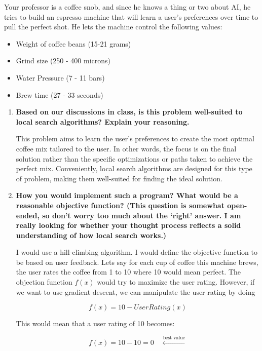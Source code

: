 \documentclass[a4paper]{article}
\begin{document}
\begin{sloppypar}
Your professor is a coffee snob, and since he knows a thing or two about AI, he tries to
build an espresso machine that will learn a user’s preferences over time to pull the perfect
shot. He lets the machine control the following values:

\begin{itemize}
    \item Weight of coffee beans (15-21 grams)
    \item Grind size (250 - 400 microns)
    \item Water Pressure (7 - 11 bars)
    \item Brew time (27 - 33 seconds)
\end{itemize}

\begin{enumerate}[start=9,label=Q\arabic*,left=0pt]
    \item \textbf{Based on our discussions in class, is this problem well-suited to local search algorithms? Explain your reasoning.}
    \par This problem aims to learn the user’s preferences to create the most optimal coffee mix tailored to the user. 
    In other words, the focus is on the final solution rather than the specific optimizations or paths taken to achieve the perfect mix. 
    Conveniently, local search algorithms are designed for this type of problem, making them well-suited for finding the ideal solution.
    
    \item \textbf{How you would implement such a program? What would be a reasonable objective function? (This question is somewhat open-ended, so don’t worry too much about the ‘right’ answer. I am really looking for whether your thought process reflects a solid understanding of how local search works.)}
    \par I would use a hill-climbing algorithm. I would define the objective function to be based on user feedback.
    Lets say for each cup of coffee this machine brews, the user rates the coffee from 1 to 10 where 10 would mean perfect.
    The objection function $f(x)$ would try to maximize the user rating. However, if we want to use gradient descent, we can manipulate the 
    user rating by doing 
    
    \[f(x) = 10 - User Rating(x)\]

    This would mean that a user rating of 10 becomes:

    \[ f(x) = 10 - 10 = 0 \quad \xleftarrow{\text{best value}} \]


\end{enumerate}
\end{sloppypar}
\end{document}
